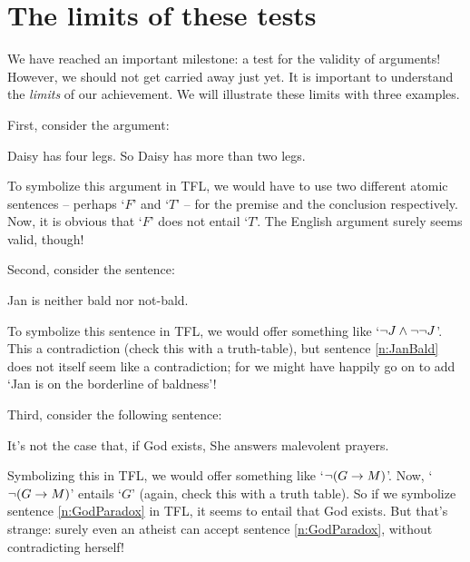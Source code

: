 \section{The limits of these tests}\label{s:ParadoxesOfMaterialConditional}
We have reached an important milestone: a test for the validity of arguments! However, we should not get carried away just yet. It is important to understand the \emph{limits} of our achievement. We will illustrate these limits with three examples.

First, consider the argument: 
	\begin{earg}
		\item Daisy has four legs. So Daisy has more than two legs.
	\end{earg}
To symbolize this argument in TFL, we would have to use two different atomic sentences -- perhaps `$F$'  and `$T$' -- for the premise and the conclusion respectively. Now, it is obvious that `$F$' does not entail `$T$'. The English argument surely seems valid, though!

Second, consider the sentence:
	\begin{earg}
\setcounter{eargnum}{1}
		\item\label{n:JanBald} Jan is neither bald nor not-bald.
	\end{earg}
To symbolize this sentence in TFL, we would offer something like `$\neg J \wedge \neg \neg J$'. This a contradiction (check this with a truth-table), but sentence \ref{n:JanBald} does not itself seem like a contradiction; for we might have happily go on to add `Jan is on the borderline of baldness'!

Third, consider the following sentence:
	\begin{earg}
\setcounter{eargnum}{2}	
		\item\label{n:GodParadox}	It's not the case that, if God exists, She answers malevolent prayers.
	\end{earg}
        Symbolizing this in TFL, we would offer something like `$\neg (G \rightarrow M)$'. Now, `$\neg (G \rightarrow M)$' entails `$G$' (again, check this with a truth table). So if we symbolize sentence \ref{n:GodParadox} in TFL, it seems to entail that God exists. But that's strange: surely even an atheist can accept sentence \ref{n:GodParadox}, without contradicting herself!

